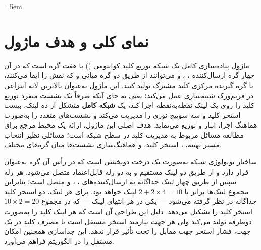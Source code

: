 \sloppy
\emergencystretch=5em



\section{نمای کلی و هدف ماژول}

ماژول  پیاده‌سازی کامل یک شبکه توزیع کلید کوانتومی () با هفت گره است که در آن چهار گره ارسال‌کننده ، ،  و  می‌توانند از طریق دو گره میانی  و  که نقش  را ایفا می‌کنند، با گره گیرنده مرکزی  کلید مشترک تولید کنند. این ماژول به‌عنوان بالاترین لایه انتزاعی در فریم‌ورک شبیه‌سازی  عمل می‌کند؛ یعنی به جای آنکه صرفاً یک نشست منفرد توزیع کلید را روی یک لینک نقطه‌به‌نقطه اجرا کند، یک \textbf{شبکه کامل} متشکل از ده لینک، بیست استخر کلید و سه سوییچ نوری را مدیریت می‌کند و نشست‌های متعدد  را به‌صورت هماهنگ اجرا، انبار و توزیع می‌نماید. هدف اصلی این ماژول، ارائه یک محیط مرجع برای مطالعه مسائل مربوط به مدیریت کلید در سطح شبکه است؛ مسائلی نظیر انتخاب مسیر بهینه، ،  استخر کلید، و هماهنگ‌سازی نشست‌ها میان گره‌های مختلف.

ساختار توپولوژی شبکه به‌صورت یک درخت دوبخشی است که در رأس آن گره  به‌عنوان  قرار دارد و از طریق دو لینک مستقیم  و  به دو رله قابل‌اعتماد متصل می‌شود. هر رله سپس از طریق چهار لینک جداگانه به ارسال‌کننده‌های ، ،  و  متصل است؛ بنابراین مجموع لینک‌ها برابر با $2 + 2 \times 4 = 10$ لینک خواهد بود. برای هر لینک، دو استخر کلید جداگانه در نظر گرفته می‌شود — یکی در هر انتهای لینک — که در مجموع $10 \times 2 = 20$ استخر کلید را تشکیل می‌دهد. دلیل این طراحی آن است که هر لینک  کلید را به‌صورت دوطرفه تولید می‌کند ولی هر جهت نیازمند استخر مستقل است تا مصرف کلید در یک جهت، فشار استخر جهت مقابل را تحت تأثیر قرار ندهد. این جداسازی همچنین امکان  مستقل را در الگوریتم  فراهم می‌آورد.

